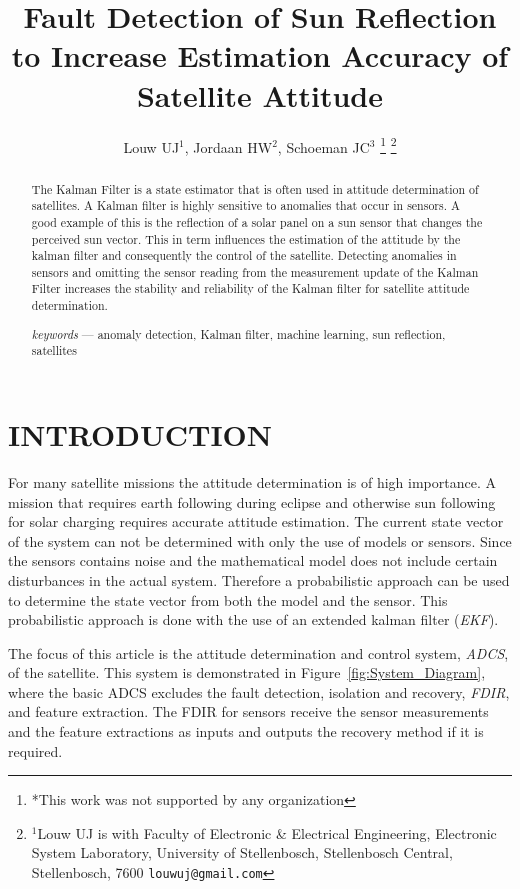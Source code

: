 \documentclass[letterpaper, 10 pt, conference]{ieeeconf}  %
\title{\LARGE \bf
Fault Detection of Sun Reflection to Increase Estimation Accuracy of Satellite Attitude
}
\author{Louw UJ$^{1}$, Jordaan HW$^{2}$, Schoeman JC$^{3}$%
\thanks{*This work was not supported by any organization}%
\thanks{$^{1}$Louw UJ is with Faculty of Electronic \& Electrical Engineering, Electronic System            Laboratory, University of Stellenbosch, Stellenbosch Central, Stellenbosch, 7600
        {\tt\small louwuj@gmail.com}}%
}
\begin{document}
\maketitle
\thispagestyle{empty}
\pagestyle{empty}


\begin{abstract}

The Kalman Filter is a state estimator that is often used in attitude determination of satellites. A Kalman filter is highly sensitive to anomalies that occur in sensors. A good example of this is the reflection of a solar panel on a sun sensor that changes the perceived sun vector. This in term influences the estimation of the attitude by the kalman filter and consequently the control of the satellite. Detecting anomalies in sensors and omitting the sensor reading from the measurement update of the Kalman Filter increases the stability and reliability of the Kalman filter for satellite attitude determination.

\emph{keywords} --- anomaly detection, Kalman filter, machine learning, sun reflection, satellites

\end{abstract}


\section{INTRODUCTION}
For many satellite missions the attitude determination is of high importance. A mission that requires earth following during eclipse and otherwise sun following for solar charging requires accurate attitude estimation. The current state vector of the system can not be determined with only the use of models or sensors. Since the sensors contains noise and the mathematical model does not include certain disturbances in the actual system. Therefore a probabilistic approach can be used to determine the state vector from both the model and the sensor. This probabilistic approach is done with the use of an extended kalman filter (\emph{EKF}). 

The focus of this article is the attitude determination and control system, \emph{ADCS}, of the satellite. This system is demonstrated in Figure~\ref{fig:System_Diagram}, where the basic ADCS excludes the fault detection, isolation and recovery, \emph{FDIR}, and feature extraction. The FDIR for sensors receive the sensor measurements and the feature extractions as inputs and outputs the recovery method if it is required. 
\end{document}
